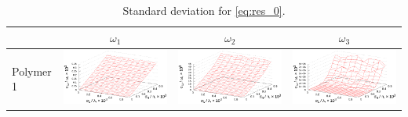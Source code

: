 \documentclass[11pt,a4paper]{article}
\theoremstyle{definition}
\begin{document}
\begin{table}[h]
  \centering
  \footnotesize
  \caption{Standard deviation for \eqref{eq:res_0}.}
  \begin{tabular}{l | c c c}
	  & $\omega_1$ & $\omega_2$ & $\omega_3$ \\ \hline
	\begin{rotate}{90}Polymer 1\end{rotate} &	\includegraphics[scale=0.4]{figs/even/p1.txt_coeff0.dat.eps} & \includegraphics[scale=0.4]{figs/even/p1.txt_coeff1.dat.eps} & \includegraphics[scale=0.4]{figs/even/p1.txt_coeff2.dat.eps} \\

\end{tabular}
\end{table}
\end{document}
